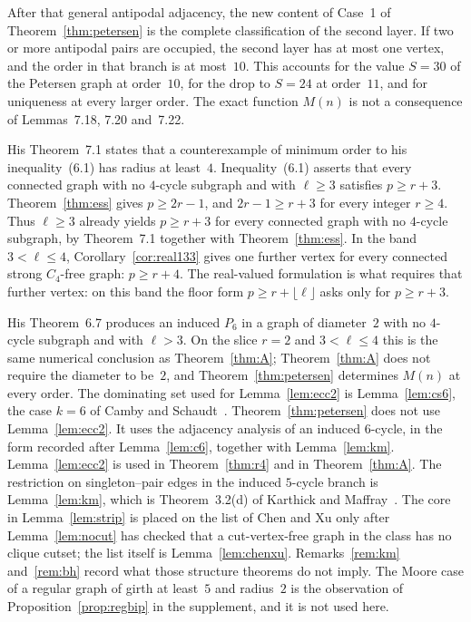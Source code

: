 \documentclass[ASNA]{USG}
\theoremstyle{WBstyletwo}
\numberwithin{equation}{section}
\newcommand{\lr}{\ell}
\newcommand{\pp}{p}
\begin{document}
After that general antipodal adjacency, the new content of Case~1 of Theorem~\ref{thm:petersen} is the complete classification of the second layer. If two or more antipodal pairs are occupied, the second layer has at most one vertex, and the order in that branch is at most~$10$. This accounts for the value $S=30$ of the Petersen graph at order~$10$, for the drop to $S=24$ at order~$11$, and for uniqueness at every larger order. The exact function $M(n)$ is not a consequence of Lemmas~7.18, 7.20 and~7.22.

His Theorem~7.1 states that a counterexample of minimum order to his inequality~(6.1) has radius at least~$4$. Inequality~(6.1) asserts that every connected graph with no $4$-cycle subgraph and with $\lr\ge 3$ satisfies $\pp\ge r+3$. Theorem~\ref{thm:ess} gives $\pp\ge 2r-1$, and $2r-1\ge r+3$ for every integer $r\ge 4$. Thus $\lr\ge 3$ already yields $\pp\ge r+3$ for every connected graph with no $4$-cycle subgraph, by Theorem~7.1 together with Theorem~\ref{thm:ess}. In the band $3<\lr\le 4$, Corollary~\ref{cor:real133} gives one further vertex for every connected strong $C_4$-free graph: $\pp\ge r+4$. The real-valued formulation is what requires that further vertex: on this band the floor form $\pp\ge r+\lfloor\lr\rfloor$ asks only for $\pp\ge r+3$.

His Theorem~6.7 produces an induced $P_6$ in a graph of diameter~$2$ with no $4$-cycle subgraph and with $\lr>3$. On the slice $r=2$ and $3<\lr\le 4$ this is the same numerical conclusion as Theorem~\ref{thm:A}; Theorem~\ref{thm:A} does not require the diameter to be~$2$, and Theorem~\ref{thm:petersen} determines $M(n)$ at every order. The dominating set used for Lemma~\ref{lem:ecc2} is Lemma~\ref{lem:cs6}, the case $k=6$ of Camby and Schaudt~\cite[Theorem~5]{cs}. Theorem~\ref{thm:petersen} does not use Lemma~\ref{lem:ecc2}. It uses the adjacency analysis of an induced $6$-cycle, in the form recorded after Lemma~\ref{lem:c6}, together with Lemma~\ref{lem:km}. Lemma~\ref{lem:ecc2} is used in Theorem~\ref{thm:r4} and in Theorem~\ref{thm:A}. The restriction on singleton--pair edges in the induced $5$-cycle branch is Lemma~\ref{lem:km}, which is Theorem~3.2(d) of Karthick and Maffray~\cite{km}. The core in Lemma~\ref{lem:strip} is placed on the list of Chen and Xu only after Lemma~\ref{lem:nocut} has checked that a cut-vertex-free graph in the class has no clique cutset; the list itself is Lemma~\ref{lem:chenxu}. Remarks~\ref{rem:km} and~\ref{rem:bh} record what those structure theorems do not imply. The Moore case of a regular graph of girth at least~$5$ and radius~$2$ is the observation of Proposition~\ref{prop:regbip} in the supplement, and it is not used here.
\end{document}
